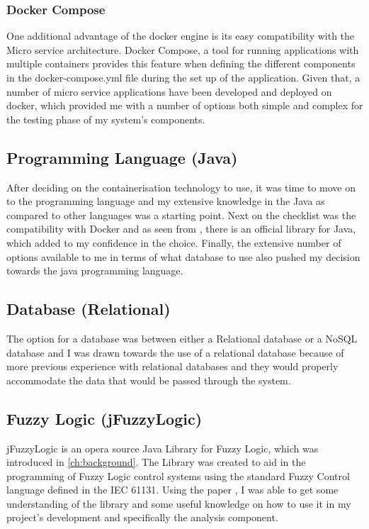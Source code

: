 \subsubsection{Docker Compose}
One additional advantage of the docker engine is its easy compatibility with the Micro service architecture\cite{Microservices}. Docker Compose\cite{docker_compose}, a tool for running applications with multiple containers provides this feature when defining the different components in the docker-compose.yml file during the set up of the application. Given that, a number of micro service applications have been developed and deployed on docker, which provided me with a number of options both simple and complex for the testing phase of my system's components.
\subsection{Programming Language (Java)}
After deciding on the containerisation technology to use, it was time to move on to the programming language and my extensive knowledge in the Java as compared to other languages was a starting point. Next on the checklist was the compatibility with Docker and as seen from \cite{dockerAPI}, there is an official library for Java, which added to my confidence in the choice. Finally, the extensive number of options available to me in terms of what database to use also pushed my decision towards the java programming language. 
\subsection{Database (Relational)}
The option for a database was between either a Relational database or a NoSQL database and I was drawn towards the use of a relational database because of more previous experience with relational databases and they would properly accommodate the data that would be passed through the system.
\subsection{Fuzzy Logic (jFuzzyLogic)}
jFuzzyLogic is an opera source Java Library for Fuzzy Logic, which was introduced in \autoref{ch:background}. The Library was created to aid in the programming of Fuzzy Logic control systems using the standard Fuzzy Control language defined in the IEC 61131. Using the paper \cite{cingolani2013jfuzzylogic}, I was able to get some understanding of the library and some useful knowledge on how to use it in my project's development and specifically the analysis component.

